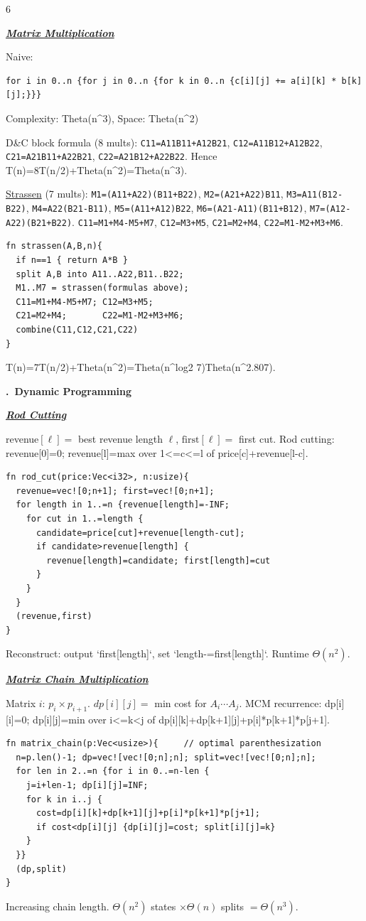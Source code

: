 \documentclass[a4paper,landscape]{article}
\renewcommand{\textbf}[1]{\underline{#1}}
\newcommand{\subsectionsize}{\fontsize{3.92}{4.02}\selectfont}
\newcommand{\sectionsize}{\fontsize{4.55}{4.65}\selectfont}
\newcounter{cheatsection}
\newcommand{\sectiontitle}[1]{%
  \par\vspace{0pt}%
  \noindent{\rule{\linewidth}{0.25pt}}\par%
  \vspace{0pt}%
  \refstepcounter{cheatsection}%
  {\sectionsize\bfseries \arabic{cheatsection}.\ #1}\par%
  \vspace{0pt}%
}
\newcommand{\subsectiontitle}[1]{%
  \par\vspace{0pt}%
  {\subsectionsize\bfseries\itshape\textbf{#1}}\par%
  \vspace{0pt}%
}
\begin{document}
\begin{multicols*}{6}
\subsectiontitle{Matrix Multiplication}

Naive:

\begin{lstlisting}[aboveskip=0pt,belowskip=0pt]
for i in 0..n {for j in 0..n {for k in 0..n {c[i][j] += a[i][k] * b[k][j];}}}
\end{lstlisting}

Complexity: Theta(n\textasciicircum 3), Space: Theta(n\textasciicircum 2)

 D\&C block formula (8 mults): \texttt{C11=A11B11+A12B21}, \texttt{C12=A11B12+A12B22}, \texttt{C21=A21B11+A22B21}, \texttt{C22=A21B12+A22B22}. Hence T(n)=8T(n/2)+Theta(n\textasciicircum2)=Theta(n\textasciicircum3).

 \textbf{Strassen} (7 mults):
\texttt{M1=(A11+A22)(B11+B22)}, \texttt{M2=(A21+A22)B11}, \texttt{M3=A11(B12-B22)}, \texttt{M4=A22(B21-B11)}, \texttt{M5=(A11+A12)B22}, \texttt{M6=(A21-A11)(B11+B12)}, \texttt{M7=(A12-A22)(B21+B22)}.
\texttt{C11=M1+M4-M5+M7}, \texttt{C12=M3+M5}, \texttt{C21=M2+M4}, \texttt{C22=M1-M2+M3+M6}.
\begin{lstlisting}[aboveskip=0pt,belowskip=0pt]
fn strassen(A,B,n){
  if n==1 { return A*B }
  split A,B into A11..A22,B11..B22;
  M1..M7 = strassen(formulas above);
  C11=M1+M4-M5+M7; C12=M3+M5;
  C21=M2+M4;       C22=M1-M2+M3+M6;
  combine(C11,C12,C21,C22)
}
\end{lstlisting}

T(n)=7T(n/2)+Theta(n\textasciicircum2)=Theta(n\textasciicircum{log2 7})\approx Theta(n\textasciicircum{2.807}).

\sectiontitle{Dynamic Programming}
\subsectiontitle{Rod Cutting}
revenue$[\ell]=$ best revenue length $\ell$, $\text{first}[\ell]=$ first cut.
Rod cutting: revenue[0]=0; revenue[l]=max over 1<=c<=l of price[c]+revenue[l-c].
\begin{lstlisting}[aboveskip=0pt,belowskip=0pt]
fn rod_cut(price:Vec<i32>, n:usize){
  revenue=vec![0;n+1]; first=vec![0;n+1];
  for length in 1..=n {revenue[length]=-INF;
    for cut in 1..=length {
      candidate=price[cut]+revenue[length-cut];
      if candidate>revenue[length] {
        revenue[length]=candidate; first[length]=cut
      }
    }
  }
  (revenue,first)
}
\end{lstlisting}
Reconstruct: output `first[length]`, set `length-=first[length]`. Runtime $\Theta(n^2)$.

\subsectiontitle{Matrix Chain Multiplication}
Matrix $i$: $p_i\times p_{i+1}$. $dp[i][j]=$ min cost for $A_i\cdots A_j$.
MCM recurrence: dp[i][i]=0; dp[i][j]=min over i<=k<j of dp[i][k]+dp[k+1][j]+p[i]*p[k+1]*p[j+1].
\begin{lstlisting}[aboveskip=0pt,belowskip=0pt]
fn matrix_chain(p:Vec<usize>){     // optimal parenthesization
  n=p.len()-1; dp=vec![vec![0;n];n]; split=vec![vec![0;n];n];
  for len in 2..=n {for i in 0..=n-len {
    j=i+len-1; dp[i][j]=INF;
    for k in i..j {
      cost=dp[i][k]+dp[k+1][j]+p[i]*p[k+1]*p[j+1];
      if cost<dp[i][j] {dp[i][j]=cost; split[i][j]=k}
    }
  }}
  (dp,split)
}
\end{lstlisting}
Increasing chain length. $\Theta(n^2)$ states $\times\Theta(n)$ splits $=\Theta(n^3)$.


\end{multicols*}
\end{document}
